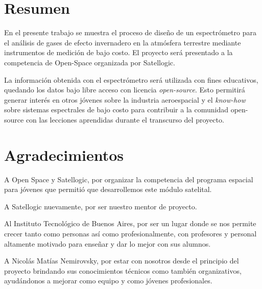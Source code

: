 \documentclass[11pt,titlepage]{article}
\begin{document}



\newpage
\section*{ }
\section*{Resumen}
En el presente trabajo se muestra el proceso de diseño de un espectrómetro para el análisis de gases de efecto invernadero en la atmósfera terrestre mediante instrumentos de medición de bajo costo. El proyecto será presentado a la competencia de Open-Space organizada por Satellogic.\par

La información obtenida con el espectrómetro será utilizada con fines educativos, quedando los datos bajo libre acceso con licencia \textit{open-source}. Esto permitirá generar interés en otros jóvenes sobre la industria aeroespacial y el \textit{know-how} sobre sistemas espectrales de bajo costo para contribuir a la comunidad open-source con las lecciones aprendidas durante el transcurso del proyecto.

\section*{Agradecimientos}
A Open Space y Satellogic, por organizar la competencia del programa espacial para j\'ovenes que permiti\'o que desarrollemos este m\'odulo satelital.\\\par 

A Satellogic nuevamente, por ser nuestro mentor de proyecto.\\\par 

Al Instituto Tecnológico de Buenos Aires, por ser un lugar donde se nos permite crecer tanto como personas así como profesionalmente, con profesores y personal altamente motivado para enseñar y dar lo mejor con sus alumnos.\\ \par

A Nicolás Mat\'ias Nemirovsky, por estar con nosotros desde el principio del proyecto brindando sus conocimientos técnicos como también organizativos, ayudándonos a mejorar como equipo y como jóvenes profesionales.\\\par
\end{document}
